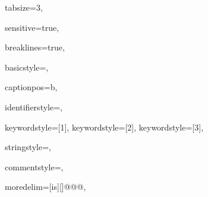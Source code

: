 {%
tabsize=3,							

sensitive=true, 

breaklines=true,

basicstyle=\ttfamily,

captionpos=b,							

identifierstyle={\ttfamily\color{black}},

keywordstyle=[1]{\ttfamily\color{red}},
keywordstyle=[2]{\ttfamily\color{blue}},
keywordstyle=[3]{\ttfamily},


stringstyle=\ttfamily,

commentstyle=\ttfamily,

moredelim=[is][\color{black}]{@@}{@},
}
